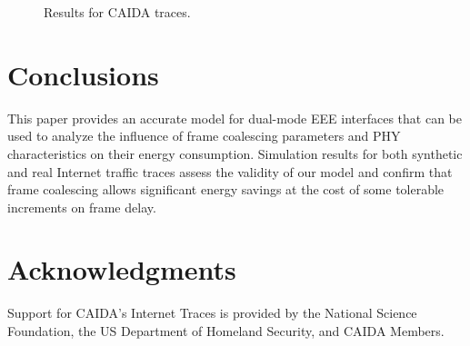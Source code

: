 \documentclass[journal,10pt,letterpaper]{IEEEtran}
\begin{document}
\begin{figure}[t]
  \centering 
  \caption{Results for CAIDA traces.}
  \label{fig:caida}
\end{figure}

\section{Conclusions}
\label{sec:conclusions}

This paper provides an accurate model for dual-mode EEE interfaces
that can be used to analyze the influence of frame coalescing
parameters and PHY characteristics on their energy
consumption. Simulation results for both synthetic and real Internet
traffic traces assess the validity of our model and confirm that frame
coalescing allows significant energy savings at the cost of some
tolerable increments on frame delay.

\section*{Acknowledgments}

Support for CAIDA's Internet Traces is provided by the National
Science Foundation, the US Department of Homeland Security, and CAIDA
Members.  





\end{document}
